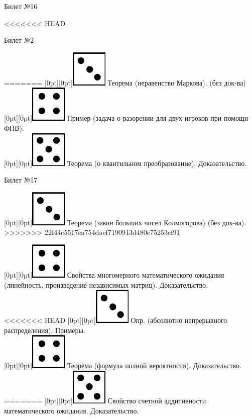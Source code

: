 \documentclass[10pt]{article}
\begin{document}
\begin{center} {\Large Билет №16} \end{center} 

<<<<<<< HEAD
\begin{center} {\Large Билет №2} \end{center} 
=======
\raisebox{-1pt}[0pt][0pt]{\includegraphics[width=0.02\linewidth]{3.png}} Теорема (неравенство Маркова). (без док-ва) \\

\raisebox{-1pt}[0pt][0pt]{\includegraphics[width=0.02\linewidth]{4.png}} Пример (задача о разорении для двух игроков при помощи ФПВ). \\ 

\raisebox{-1pt}[0pt][0pt]{\includegraphics[width=0.02\linewidth]{5.png}}  Теорема (о квантильном преобразование). Доказательство. \\

\begin{center} {\Large Билет №17} \end{center} 

\raisebox{-1pt}[0pt][0pt]{\includegraphics[width=0.02\linewidth]{3.png}} Теорема (закон больших чисел Колмогорова) (без док-ва). \\
>>>>>>> 22f44c5517ca754daef7190913d480e75253ef91

\raisebox{-1pt}[0pt][0pt]{\includegraphics[width=0.02\linewidth]{4.png}} Свойства многомерного математического ожидания (линейность, произведение независимых матриц). Доказательство. \\ 

<<<<<<< HEAD
\raisebox{-1pt}[0pt][0pt]{\includegraphics[width=0.02\linewidth]{3.png}} Опр. (абсолютно непрерывного распределения). Примеры. \\

\raisebox{-1pt}[0pt][0pt]{\includegraphics[width=0.02\linewidth]{4.png}} Теорема (формула полной вероятности). Доказательство. \\
=======
\raisebox{-1pt}[0pt][0pt]{\includegraphics[width=0.02\linewidth]{5.png}}  Свойство счетной аддитивности математического ожидания. Доказательство. \\
\end{document}
